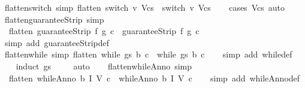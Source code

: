 \begin{isabellebody}
\endisatagproof
{\isafoldproof}%
%
\isadelimproof
\isanewline
%
\endisadelimproof
\isanewline
{}\isamarkupfalse%
\ flatten{\isacharunderscore}switch\ {\isacharbrackleft}simp{\isacharbrackright}{\isacharcolon}\ {\isachardoublequoteopen}flatten\ {\isacharparenleft}switch\ v\ Vcs{\isacharparenright}\ {\isacharequal}\ {\isacharbrackleft}switch\ v\ Vcs{\isacharbrackright}{\isachardoublequoteclose}\isanewline
%
\isadelimproof
\ \ %
\endisadelimproof
%
\isatagproof
{}\isamarkupfalse%
\ {\isacharparenleft}cases\ Vcs{\isacharparenright}\ auto%
\endisatagproof
{\isafoldproof}%
%
\isadelimproof
\isanewline
%
\endisadelimproof
\isanewline
{}\isamarkupfalse%
\ flatten{\isacharunderscore}guaranteeStrip\ {\isacharbrackleft}simp{\isacharbrackright}{\isacharcolon}\ \isanewline
\ \ {\isachardoublequoteopen}flatten\ {\isacharparenleft}guaranteeStrip\ f\ g\ c{\isacharparenright}\ {\isacharequal}\ {\isacharbrackleft}guaranteeStrip\ f\ g\ c{\isacharbrackright}{\isachardoublequoteclose}\isanewline
%
\isadelimproof
\ \ %
\endisadelimproof
%
\isatagproof
{}\isamarkupfalse%
\ {\isacharparenleft}simp\ add{\isacharcolon}\ guaranteeStrip{\isacharunderscore}def{\isacharparenright}%
\endisatagproof
{\isafoldproof}%
%
\isadelimproof
\isanewline
%
\endisadelimproof
\isanewline
{}\isamarkupfalse%
\ flatten{\isacharunderscore}while\ {\isacharbrackleft}simp{\isacharbrackright}{\isacharcolon}\ {\isachardoublequoteopen}flatten\ {\isacharparenleft}while\ gs\ b\ c{\isacharparenright}\ {\isacharequal}\ {\isacharbrackleft}while\ gs\ b\ c{\isacharbrackright}{\isachardoublequoteclose}\isanewline
%
\isadelimproof
\ \ %
\endisadelimproof
%
\isatagproof
{}\isamarkupfalse%
\ {\isacharparenleft}simp\ add{\isacharcolon}\ while{\isacharunderscore}def{\isacharparenright}\isanewline
\ \ \isamarkupfalse%
\ {\isacharparenleft}induct\ gs{\isacharparenright}\isanewline
\ \ \isamarkupfalse%
\ \ auto\isanewline
\ \ \isamarkupfalse%
%
\endisatagproof
{\isafoldproof}%
%
\isadelimproof
\isanewline
%
\endisadelimproof
\isanewline
{}\isamarkupfalse%
\ flatten{\isacharunderscore}whileAnno\ {\isacharbrackleft}simp{\isacharbrackright}{\isacharcolon}\ \isanewline
\ \ {\isachardoublequoteopen}flatten\ {\isacharparenleft}whileAnno\ b\ I\ V\ c{\isacharparenright}\ {\isacharequal}\ {\isacharbrackleft}whileAnno\ b\ I\ V\ c{\isacharbrackright}{\isachardoublequoteclose}\isanewline
%
\isadelimproof
\ \ %
\endisadelimproof
%
\isatagproof
{}\isamarkupfalse%
\ {\isacharparenleft}simp\ add{\isacharcolon}\ whileAnno{\isacharunderscore}def{\isacharparenright}%

\end{isabellebody}
